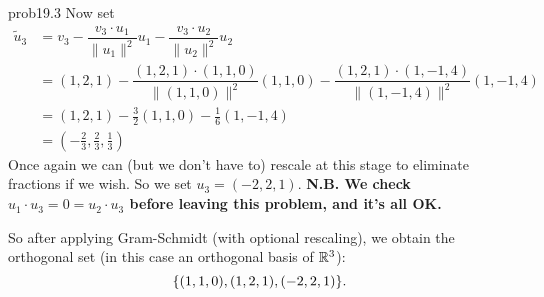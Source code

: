 \begin{sol}{prob19.3}
Now set 
\begin{align*}
 \tilde u_3 &=v_3 -\dfrac{v_3\cdot u_1}{\| u_1\|^2}u_1-\dfrac{v_3\cdot u_2}{\| u_2\|^2}u_2 \\
  &= (1,2,1)-\dfrac{(1,2,1)\cdot (1, 1,0)}{\| (1, 1, 0)\|^2}(1, 1,0)-\dfrac{(1,2,1)\cdot (1,-1,4)}{\| (1,-1,4)\|^2}(1,-1,4)\\
  &=(1,2,1)-\frac32(1, 1,0)-\frac{1}{6}(1,-1,4)\\
  &= (-\frac23,\frac23  ,\frac13 )\end{align*}
Once again we can (but we don't have to) rescale at this stage to eliminate fractions if we wish. So we set $u_3=(-2,2,1)$. 
 {\bf N.B. We check $u_1\cdot u_3=0=u_2\cdot u_3$ before leaving this problem, and it's all OK.}

So after applying Gram-Schmidt (with optional rescaling), we obtain the orthogonal set (in this case an orthogonal basis of $\mathbb{R}^3$):  $$\{(1, 1,0),(1,2,1),(-2,2,1) \}.$$

%

\end{sol}

